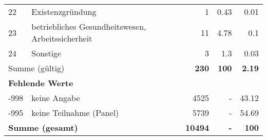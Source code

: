 \begin{longtable}{lXrrr}
        22 & \multicolumn{1}{X}{Existenzgründung} & %
          \num{1} &
          \num[round-mode=places,round-precision=2]{0,43} &
          \num[round-mode=places,round-precision=2]{0,01} \\

        23 & \multicolumn{1}{X}{betriebliches Gesundheitswesen, Arbeitssicherheit} & %
          \num{11} &
          \num[round-mode=places,round-precision=2]{4,78} &
          \num[round-mode=places,round-precision=2]{0,1} \\

        24 & \multicolumn{1}{X}{Sonstige} & %
          \num{3} &
          \num[round-mode=places,round-precision=2]{1,3} &
          \num[round-mode=places,round-precision=2]{0,03} \\

     \midrule
     \multicolumn{2}{l}{Summe (gültig)} &
       \textbf{\num{230}} &
     \textbf{100} &
       \textbf{\num[round-mode=places,round-precision=2]{2,19}} \\
     \multicolumn{5}{l}{\textbf{Fehlende Werte}}\\
       -998 &
       keine Angabe &
         \num{4525} &
        - &
         \num[round-mode=places,round-precision=2]{43,12} \\
       -995 &
       keine Teilnahme (Panel) &
         \num{5739} &
        - &
         \num[round-mode=places,round-precision=2]{54,69} \\
     \midrule
     \multicolumn{2}{l}{\textbf{Summe (gesamt)}} &
          \textbf{\num{10494}} &
        \textbf{-} &
        \textbf{100} \\
     \bottomrule
     \end{longtable}
     
